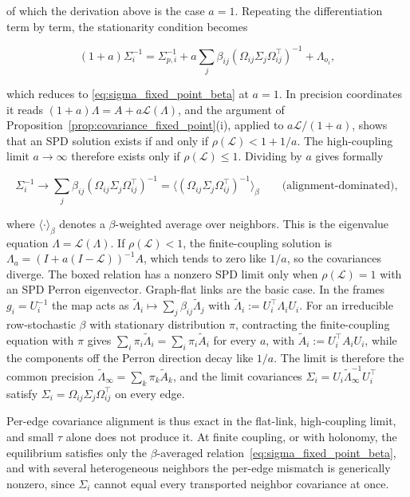 of which the derivation above is the case $a = 1$. Repeating the differentiation term by term, the stationarity condition becomes

\begin{equation}
(1 + a)\Sigma_i^{-1}
=\Sigma_{p,i}^{-1}
+ a \sum_j \beta_{ij}
(\Omega_{ij}\Sigma_j\Omega_{ij}^\top)^{-1}
+ \Lambda_{o_i},
\end{equation}

which reduces to \eqref{eq:sigma_fixed_point_beta} at $a = 1$. In precision coordinates it reads $(1+a)\Lambda = A + a\mathcal{L}(\Lambda)$, and the argument of Proposition~\ref{prop:covariance_fixed_point}(i), applied to $a\mathcal{L}/(1+a)$, shows that an SPD solution exists if and only if $\rho(\mathcal{L}) < 1 + 1/a$. The high-coupling limit $a \to \infty$ therefore exists only if $\rho(\mathcal{L}) \leq 1$. Dividing by $a$ gives formally

\begin{equation}
\boxed{
\Sigma_i^{-1}
\longrightarrow
\sum_j \beta_{ij}
(\Omega_{ij}\Sigma_j\Omega_{ij}^\top)^{-1}
=\big\langle(\Omega_{ij}\Sigma_j\Omega_{ij}^\top)^{-1}
\big\rangle_{\beta}
\qquad \text{(alignment-dominated)},}
\label{eq:beta_weighted_precision}
\end{equation}

where $\langle \cdot \rangle_{\beta}$ denotes a $\beta$-weighted average over neighbors. This is the eigenvalue equation $\Lambda = \mathcal{L}(\Lambda)$. If $\rho(\mathcal{L}) < 1$, the finite-coupling solution is $\Lambda_a = (I + a(I - \mathcal{L}))^{-1}A$, which tends to zero like $1/a$, so the covariances diverge. The boxed relation has a nonzero SPD limit only when $\rho(\mathcal{L}) = 1$ with an SPD Perron eigenvector. Graph-flat links are the basic case. In the frames $g_i = U_i^{-1}$ the map acts as $\tilde\Lambda_i \mapsto \sum_j\beta_{ij}\tilde\Lambda_j$ with $\tilde\Lambda_i := U_i^\top\Lambda_iU_i$. For an irreducible row-stochastic $\beta$ with stationary distribution $\pi$, contracting the finite-coupling equation with $\pi$ gives $\sum_i\pi_i\tilde\Lambda_i = \sum_i\pi_i\tilde A_i$ for every $a$, with $\tilde A_i := U_i^\top A_iU_i$, while the components off the Perron direction decay like $1/a$. The limit is therefore the common precision $\tilde\Lambda_\infty = \sum_k\pi_k\tilde A_k$, and the limit covariances $\Sigma_i = U_i\tilde\Lambda_\infty^{-1}U_i^\top$ satisfy $\Sigma_i = \Omega_{ij}\Sigma_j\Omega_{ij}^\top$ on every edge.

Per-edge covariance alignment is thus exact in the flat-link, high-coupling limit, and small $\tau$ alone does not produce it. At finite coupling, or with holonomy, the equilibrium satisfies only the $\beta$-averaged relation~\eqref{eq:sigma_fixed_point_beta}, and with several heterogeneous neighbors the per-edge mismatch is generically nonzero, since $\Sigma_i$ cannot equal every transported neighbor covariance at once.

